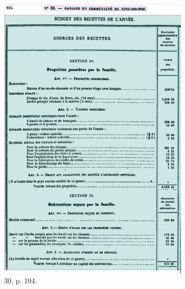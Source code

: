 \begin{figure}[t]
    \centering
    \begin{subfigure}{0.3\textwidth}
     \includegraphics[width=1\linewidth]{img/transkribus_30.png}
     \caption{\no{}30, p. 104.}
     \label{fig:odm30tkb}
    \end{subfigure}
    \hspace{5pt}
    \begin{subfigure}{0.3\textwidth}

\end{subfigure}
\end{figure}
